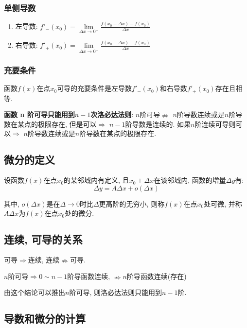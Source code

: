 \subsubsection{单侧导数}
\begin{enumerate}
    \item 左导数: $ f'_{-}(x_{0})=\lim\limits_{\Delta x\rightarrow 0^{-}}\frac{f(x_{0}+\Delta x)-f(x_{0})}{\Delta x} $
    \item 右导数: $ f'_{+}(x_{0})=\lim\limits_{\Delta x\rightarrow 0^{+}}\frac{f(x_{0}+\Delta x)-f(x_{0})}{\Delta x} $
\end{enumerate}
\subsubsection{充要条件}
函数$ f(x) $在点$ x_{0} $可导的充要条件是左导数$ f'_{-}(x_{0}) $和右导数$ f'_{+}(x_{0}) $存在且相等.
\begin{tcolorbox}
    \textbf{函数$ $ n $ $阶可导只能用到$ n-1 $次洛必达法则}:  $ n $阶可导$ \nRightarrow $ $ n $阶导数连续或是$ n $阶导数在某点的极限存在, 但是可以$ \Rightarrow $ $ n-1 $阶导数是连续的. 如果$ n $阶连续可导则可以$ \Rightarrow $ $ n $阶导数连续或是$ n $阶导数在某点的极限存在.
\end{tcolorbox}
\subsection{微分的定义}
设函数$ f(x) $在点$ x_{0} $的某邻域内有定义, 且$ x_{0}+\Delta x $在该邻域内, 函数的增量$ \Delta y $有:
\begin{equation*}
    \Delta y=A\Delta x+o(\Delta x)
\end{equation*}\par
其中, $ o(\Delta x) $是在$ \Delta \rightarrow 0 $时比$ \Delta $更高阶的无穷小, 则称$ f(x) $在点$ x_{0} $处可微, 并称$ A\Delta x $为$ f(x) $在点$ x_{0} $处的微分.
\subsection{连续, 可导的关系}
可导$ \Rightarrow $连续, 连续$ \nRightarrow $可导.
\begin{tcolorbox}
    $ n $阶可导$ \Rightarrow 0\sim n-1 $阶导函数连续, $ \nRightarrow n $阶导函数连续(存在)\par
    由这个结论可以推出$ n $阶可导, 则洛必达法则只能用到$ n-1 $阶.
\end{tcolorbox}
\subsection{导数和微分的计算}\label{求导的方法}
